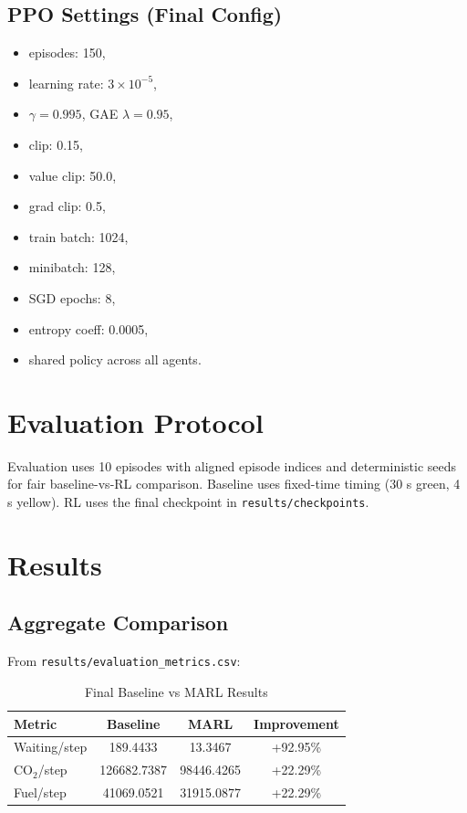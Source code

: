 \documentclass[conference]{IEEEtran}
\begin{document}
\subsection{PPO Settings (Final Config)}
\begin{itemize}
    \item episodes: 150,
    \item learning rate: $3\times10^{-5}$,
    \item $\gamma=0.995$, GAE $\lambda=0.95$,
    \item clip: 0.15,
    \item value clip: 50.0,
    \item grad clip: 0.5,
    \item train batch: 1024,
    \item minibatch: 128,
    \item SGD epochs: 8,
    \item entropy coeff: 0.0005,
    \item shared policy across all agents.
\end{itemize}

\section{Evaluation Protocol}
Evaluation uses 10 episodes with aligned episode indices and deterministic seeds for fair baseline-vs-RL comparison. Baseline uses fixed-time timing (30 s green, 4 s yellow). RL uses the final checkpoint in \texttt{results/checkpoints}.

\section{Results}
\subsection{Aggregate Comparison}
From \texttt{results/evaluation\_metrics.csv}:
\begin{table}[!t]
\centering
\caption{Final Baseline vs MARL Results}
\label{tab:results}
\begin{tabular}{lccc}
\toprule
Metric & Baseline & MARL & Improvement \\
\midrule
Waiting/step & 189.4433 & 13.3467 & +92.95\% \\
CO$_2$/step & 126682.7387 & 98446.4265 & +22.29\% \\
Fuel/step & 41069.0521 & 31915.0877 & +22.29\% \\
\bottomrule
\end{tabular}
\end{table}
\end{document}
